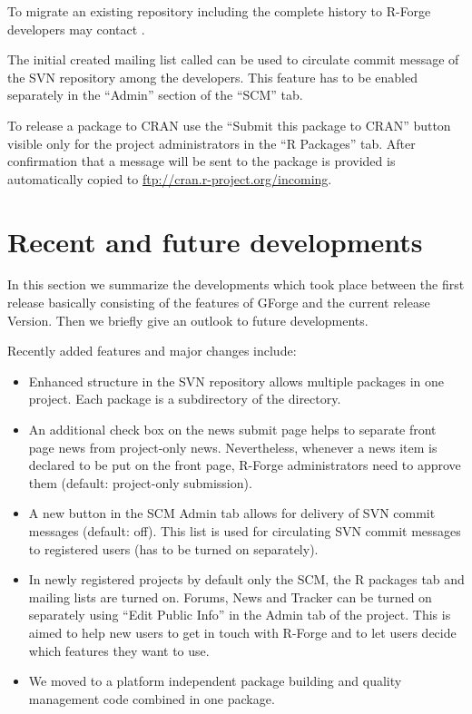 To migrate an existing repository including the complete history to
R-Forge developers may contact .

The initial created mailing list called
 can be used to
circulate commit message of the SVN repository among the
developers. This feature has to be enabled separately in the ``Admin''
section of the ``SCM'' tab. 

To release a package to CRAN use the
``Submit this package to CRAN'' button visible only for the project
administrators in the ``R Packages'' tab. After confirmation that a
message will be sent to  the package is
provided is automatically copied to
\url{ftp://cran.r-project.org/incoming}.

\section*{Recent and future developments}
In this section we summarize the developments which took place between
the first release basically consisting of the features of GForge and
the current release Version. Then we briefly give an outlook to future
developments.

Recently added features and major changes include:
\begin{itemize}
\item Enhanced structure in the SVN repository allows multiple
  packages in one project. Each package is a subdirectory of the
   directory.
\item An additional check box on the news submit page helps to
  separate front page news from project-only news. Nevertheless,
  whenever a news item is declared to be put on the front page,
  R-Forge administrators need to approve them (default: project-only
  submission).
\item A new button in the SCM Admin tab allows for delivery of SVN
  commit messages (default: off).  This
  list is used for circulating SVN commit messages to registered
  users (has to be turned on separately).
\item In newly registered projects by default only the SCM, the R
  packages tab and mailing lists are turned on. Forums, News and
  Tracker can be turned on separately using ``Edit Public Info'' in
  the Admin tab of the project. This is aimed to help new users to get
  in touch with R-Forge and to let users decide which features they
  want to use.
\item We moved to a platform independent package building and quality
  management code combined in one \R{} package.
\end{itemize}

